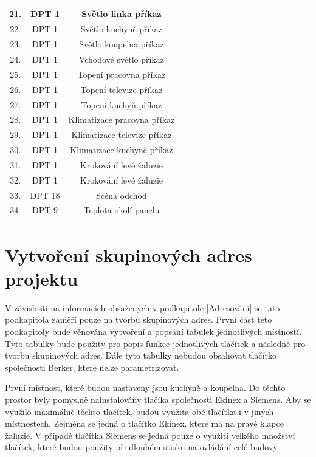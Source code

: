 \begin{table}[!ht]
\begin{tabular}{|c|c|c|}
          \hline
            21. & DPT 1 & Světlo linka příkaz \\
          \hline
            22. & DPT 1 & Světlo kuchyně příkaz \\
          \hline
            23. & DPT 1 & Světlo koupelna příkaz \\
          \hline
            24. & DPT 1 & Vchodové světlo příkaz \\
          \hline
            25. & DPT 1 & Topení pracovna příkaz \\
          \hline
            26. & DPT 1 & Topení televize příkaz \\
          \hline
            27. & DPT 1 & Topení kuchyň příkaz \\
          \hline
            28. & DPT 1 & Klimatizace pracovna příkaz \\
          \hline
            29. & DPT 1 & Klimatizace televize příkaz \\
          \hline
            30. & DPT 1 & Klimatizace kuchyně příkaz \\
          \hline
            31. & DPT 1 & Krokování levé žaluzie \\
          \hline
            32. & DPT 1 & Krokování levé žaluzie \\
          \hline
            33. & DPT 18 & Scéna odchod \\
          \hline
            34. & DPT 9 & Teplota okolí panelu \\
          \hline
  \end{tabular}
\end{table}
\newpage
\section{Vytvoření skupinových adres projektu}
V závislosti na informacích obsažených v podkapitole \ref{Adresování} se tato podkapitola zaměří pouze na tvorbu skupinových adres. První část této podkapitoly bude věnována vytvoření a popsání tabulek jednotlivých místností. Tyto tabulky bude použity pro popis funkce jednotlivých tlačítek a následně pro tvorbu skupinových adres. Dále tyto tabulky nebudou obsahovat tlačítko společnosti Berker, které nelze parametrizovat.

První místnost, které budou nastaveny jsou kuchyně a koupelna. Do těchto prostor byly pomyslně nainstalovány tlačíka společnosti Ekinex a Siemens. Aby se využilo maximálně těchto tlačítek, budou využita obě tlačítka i v jiných místnostech. Zejména se jedná o tlačítko Ekinex, které má na pravé klapce žaluzie. V případě tlačítka Siemens se jedná pouze o využití velkého množství tlačítek, které budou použity při dlouhém stisku na ovládání celé budovy. 

